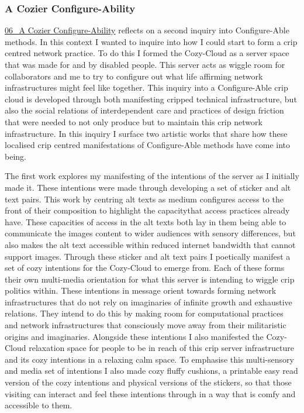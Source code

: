 \hypertarget{a-cozier-configure-ability}{%
\subsubsection{A Cozier
Configure-Ability}\label{a-cozier-configure-ability}}

\href{../../06_A\%20Cozier\%20Configure-Ability/06_A\%20Cozier\%20Configure-Ability.md}{06\_A
Cozier Configure-Ability} reflects on a second inquiry into
Configure-Able methods. In this context I wanted to inquire into how I
could start to form a crip centred network practice. To do this I formed
the Cozy-Cloud as a server space that was made for and by disabled
people. This server acts as wiggle room for collaborators and me to try
to configure out what life affirming network infrastructures might feel
like together. This inquiry into a Configure-Able crip cloud is
developed through both manifesting cripped technical infrastructure, but
also the social relations of interdependent care and practices of design
friction that were needed to not only produce but to maintain this crip
network infrastructure. In this inquiry I surface two artistic works
that share how these localised crip centred manifestations of
Configure-Able methods have come into being.

The first work explores my manifesting of the intentions of the server
as I initially made it. These intentions were made through developing a
set of sticker and alt text pairs. This work by centring alt texts as
medium configures access to the front of their composition to highlight
the capacitythat access practices already have. These capacities of
access in the alt texts both lay in them being able to communicate the
images content to wider audiences with sensory differences, but also
makes the alt text accessible within reduced internet bandwidth that
cannot support images. Through these sticker and alt text pairs I
poetically manifest a set of cozy intentions for the Cozy-Cloud to
emerge from. Each of these forms their own multi-media orientation for
what this server is intending to wiggle crip politics within. These
intentions in message orient towards forming network infrastructures
that do not rely on imaginaries of infinite growth and exhaustive
relations. They intend to do this by making room for computational
practices and network infrastructures that consciously move away from
their militaristic origins and imaginaries. Alongside these intentions I
also manifested the Cozy-Cloud relaxation space for people to be in
reach of this crip server infrastructure and its cozy intentions in a
relaxing calm space. To emphasise this multi-sensory and media set of
intentions I also made cozy fluffy cushions, a printable easy read
version of the cozy intentions and physical versions of the stickers, so
that those visiting can interact and feel these intentions through in a
way that is comfy and accessible to them.

